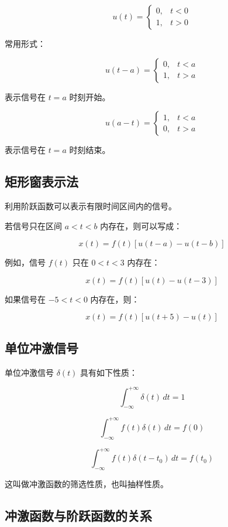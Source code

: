 \documentclass[UTF8]{ctexart}
\begin{document}
\[
u(t)=
\begin{cases}
0, & t<0\\
1, & t>0
\end{cases}
\]

常用形式：

\[
u(t-a)=
\begin{cases}
0, & t<a\\
1, & t>a
\end{cases}
\]

表示信号在 $t=a$ 时刻开始。

\[
u(a-t)=
\begin{cases}
1, & t<a\\
0, & t>a
\end{cases}
\]

表示信号在 $t=a$ 时刻结束。

\subsection{矩形窗表示法}

利用阶跃函数可以表示有限时间区间内的信号。

若信号只在区间 $a<t<b$ 内存在，则可以写成：

\[
x(t)=f(t)\left[u(t-a)-u(t-b)\right]
\]

例如，信号 $f(t)$ 只在 $0<t<3$ 内存在：

\[
x(t)=f(t)\left[u(t)-u(t-3)\right]
\]

如果信号在 $-5<t<0$ 内存在，则：

\[
x(t)=f(t)\left[u(t+5)-u(t)\right]
\]

\subsection{单位冲激信号}

单位冲激信号 $\delta(t)$ 具有如下性质：

\begin{tcolorbox}[colback=yellow!8!white,colframe=orange!80!black,title=冲激信号的重要性质]
\[
\int_{-\infty}^{+\infty}\delta(t)\,dt=1
\]

\[
\int_{-\infty}^{+\infty}f(t)\delta(t)\,dt=f(0)
\]

\[
\int_{-\infty}^{+\infty}f(t)\delta(t-t_0)\,dt=f(t_0)
\]
\end{tcolorbox}

这叫做冲激函数的筛选性质，也叫抽样性质。

\subsection{冲激函数与阶跃函数的关系}
\end{document}
